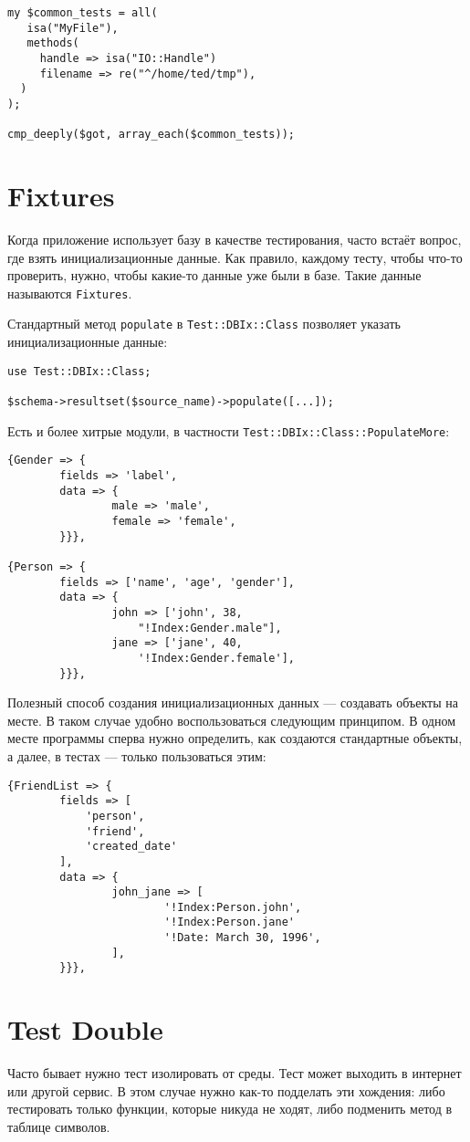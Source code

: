 \begin{verbatim}
my $common_tests = all(
   isa("MyFile"),
   methods(
     handle => isa("IO::Handle")
     filename => re("^/home/ted/tmp"),
  )
);

cmp_deeply($got, array_each($common_tests));
\end{verbatim}

\section{Fixtures}
Когда приложение использует базу в качестве тестирования, часто встаёт вопрос, где взять инициализационные данные. Как правило, каждому тесту, чтобы что-то проверить, нужно, чтобы какие-то данные уже были в базе. Такие данные называются \verb|Fixtures|.

Стандартный метод \verb|populate| в \verb|Test::DBIx::Class| позволяет указать инициализационные данные:
\begin{verbatim}
use Test::DBIx::Class;

$schema->resultset($source_name)->populate([...]);
\end{verbatim}
Есть и более хитрые модули, в частности \verb|Test::DBIx::Class::PopulateMore|:
\begin{verbatim}
{Gender => {
        fields => 'label',
        data => {
                male => 'male',
                female => 'female',
        }}},

{Person => {
        fields => ['name', 'age', 'gender'],
        data => {
                john => ['john', 38,
                    "!Index:Gender.male"],
                jane => ['jane', 40,
                    '!Index:Gender.female'],
        }}},
\end{verbatim}
Полезный способ создания инициализационных данных --- создавать объекты на месте. В таком случае удобно воспользоваться следующим принципом. В одном месте программы сперва нужно определить, как создаются стандартные объекты, а далее, в тестах --- только пользоваться этим:
\begin{verbatim}
{FriendList => {
        fields => [
            'person',
            'friend',
            'created_date'
        ],
        data => {
                john_jane => [
                        '!Index:Person.john',
                        '!Index:Person.jane'
                        '!Date: March 30, 1996',
                ],
        }}},
\end{verbatim}

\section{Test Double}
Часто бывает нужно тест изолировать от среды. Тест может выходить в интернет или другой сервис. В этом случае нужно как-то подделать эти хождения: либо тестировать только функции, которые никуда не ходят, либо подменить метод в таблице символов.

